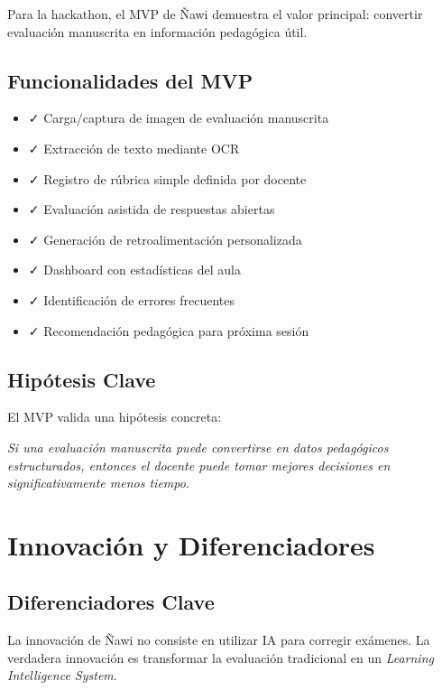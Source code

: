 \documentclass[12pt]{article}
\begin{document}
Para la hackathon, el MVP de Ñawi demuestra el valor principal: convertir evaluación manuscrita en información pedagógica útil.

\subsection{Funcionalidades del MVP}

\begin{itemize}
    \item ✓ Carga/captura de imagen de evaluación manuscrita
    \item ✓ Extracción de texto mediante OCR
    \item ✓ Registro de rúbrica simple definida por docente
    \item ✓ Evaluación asistida de respuestas abiertas
    \item ✓ Generación de retroalimentación personalizada
    \item ✓ Dashboard con estadísticas del aula
    \item ✓ Identificación de errores frecuentes
    \item ✓ Recomendación pedagógica para próxima sesión
\end{itemize}

\subsection{Hipótesis Clave}

El MVP valida una hipótesis concreta:

\begin{center}
\textit{Si una evaluación manuscrita puede convertirse en datos pedagógicos estructurados, entonces el docente puede tomar mejores decisiones en significativamente menos tiempo.}
\end{center}

\section{Innovación y Diferenciadores}

\subsection{Diferenciadores Clave}

La innovación de Ñawi no consiste en utilizar IA para corregir exámenes. La verdadera innovación es transformar la evaluación tradicional en un \textit{Learning Intelligence System}.
\end{document}

